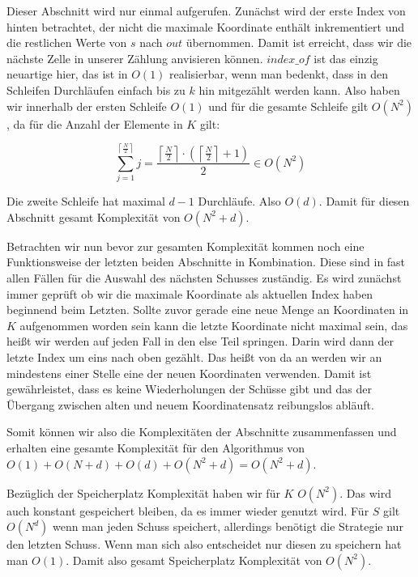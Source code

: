 \documentclass[a4paper,12pt]{llncs}
\numberwithin{equation}{section}
\begin{document}
Dieser Abschnitt wird nur einmal aufgerufen. Zunächst wird der erste Index von hinten betrachtet, der nicht die maximale Koordinate enthält inkrementiert und die restlichen Werte von $s$ nach $out$ übernommen. Damit ist erreicht, dass wir die nächste Zelle in unserer Zählung anvisieren können. $index\_of$ ist das einzig neuartige hier, das ist in $O(1)$ realisierbar, wenn man bedenkt, dass in den Schleifen Durchläufen einfach bis zu $k$ hin mitgezählt werden kann. Also haben wir innerhalb der ersten Schleife $O(1)$ und für die gesamte Schleife gilt $O\left(N^2\right)$, da für die Anzahl der Elemente in $K$ gilt:

\begin{equation}
\sum_{j=1}^{\left\lceil\frac{N}{2}\right\rceil}j=\frac{\left\lceil\frac{N}{2}\right\rceil\cdot\left(\left\lceil\frac{N}{2}\right\rceil+1\right)}{2}\in O\left(N^2\right)
\end{equation}
 
 Die zweite Schleife hat maximal $d-1$ Durchläufe. Also $O(d)$. Damit für diesen Abschnitt gesamt Komplexität von $O\left(N^2+d\right)$.


Betrachten wir nun bevor zur gesamten Komplexität kommen noch eine Funktionsweise der letzten beiden Abschnitte in Kombination. Diese sind in fast allen Fällen für die Auswahl des nächsten Schusses zuständig. Es wird zunächst immer geprüft ob wir die maximale Koordinate als aktuellen Index haben beginnend beim Letzten. Sollte zuvor gerade eine neue Menge an Koordinaten in $K$ aufgenommen worden sein kann die letzte Koordinate nicht maximal sein, das heißt wir werden auf jeden Fall in den else Teil springen. Darin wird dann der letzte Index um eins nach oben gezählt. Das heißt von da an werden wir an mindestens einer Stelle eine der neuen Koordinaten verwenden. Damit ist gewährleistet, dass es keine Wiederholungen der Schüsse gibt und das der Übergang zwischen alten und neuem Koordinatensatz reibungslos abläuft.

Somit können wir also die Komplexitäten der Abschnitte zusammenfassen und erhalten eine gesamte Komplexität für den Algorithmus von $O(1)+O(N+d)+O(d)+O(N^2+d)=O(N^2+d)$.


Bezüglich der Speicherplatz Komplexität haben wir für $K$ $O(N^2)$. Das wird auch konstant gespeichert bleiben, da es immer wieder genutzt wird. Für $S$ gilt $O(N^d)$ wenn man jeden Schuss speichert, allerdings benötigt die Strategie nur den letzten Schuss. Wenn man sich also entscheidet nur diesen zu speichern hat man $O(1)$. Damit also gesamt Speicherplatz Komplexität von $O(N^2)$.
\end{document}
